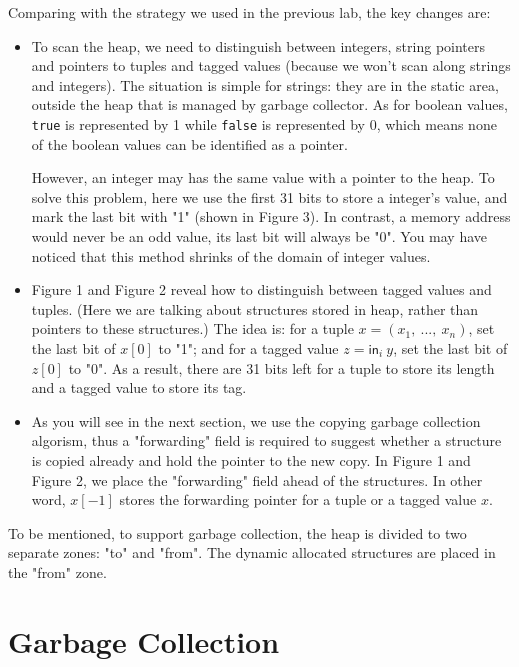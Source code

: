 \documentclass{article}
\theoremstyle{definition}
\theoremstyle{remark}
\numberwithin{equation}{section}
\begin{document}
Comparing with the strategy we used in the previous lab, the key changes are:
\begin{itemize}
  \item To scan the heap, we need to distinguish between integers, string pointers and
  pointers to tuples and tagged values (because we won't scan along strings and integers).
   The situation is simple for strings: they are
  in the static area, outside the heap that is managed by garbage collector.
  As for boolean values, \texttt{true} is represented by 1 while \texttt{false}
   is represented by 0,
  which means none of the boolean values can be identified as a pointer.

  However, an integer may has the same value with a pointer to the heap.
  To solve this problem,
  here we use the first 31 bits to store a integer's value, and mark the last bit with "1"
  (shown in Figure 3). In contrast, a memory address would never be an odd value,
   its last bit will always be "0". You may have noticed that this method shrinks
   of the domain of integer values.
  \item Figure 1 and Figure 2 reveal how to distinguish between tagged values and tuples.
  (Here we are talking about structures stored in heap, rather than pointers to these
  structures.) The idea is: for a tuple $x=(x_1,\ ...,\ x_n)$, set the last bit of $x[0]$
  to "1"; and for a tagged value $z=\textsf{in}_i\ y$, set the last bit of $z[0]$
  to "0". As a result, there are 31 bits left for a tuple to store its length and a
  tagged value to store its tag.
  \item As you will see in the next section, we use the copying garbage collection
  algorism, thus a "forwarding" field is required to suggest whether a structure is
  copied already and hold the pointer to the new copy. In Figure 1 and Figure 2,
  we place the "forwarding" field ahead of the structures. In other word, $x[-1]$ stores
  the forwarding pointer for a tuple or a tagged value $x$.
\end{itemize}

To be mentioned, to support garbage collection, the heap is divided to two separate zones:
 "to" and "from". The dynamic allocated structures are placed in the "from" zone. \\


\section{Garbage Collection}
\end{document}
